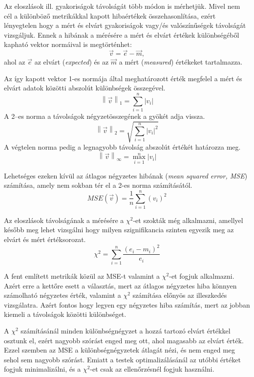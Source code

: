 

Az eloszlások ill. gyakoriságok távolságát több módon is mérhetjük.
Mivel nem cél a különböző metrikákkal kapott hibaértékek összehasonlítása, ezért lényegtelen hogy a mért és elvárt gyakoriságok vagy/és valószínűségek távolságát vizsgáljuk.
Ennek a hibának a mérésére a mért és elvárt értékek különbségéből kapható vektor normáival is megtörténhet:
\[
\vec{v} = \vec{e} - \vec{m},
\]
ahol az $\vec{e}$ az elvárt (\textit{expected}) és az $\vec{m}$ a mért (\textit{measured}) értékeket tartalmazza.

Az így kapott vektor 1-es normája által meghatározott érték megfelel a mért és elvárt adatok közötti abszolút különbségek összegével.
\[
\left\lVert\vec{v}\right\rVert_1 = \sum\limits_{i=1}^{n} |v_i|
\]
A 2--es norma a távolságok négyzetösszegének a gyökét adja vissza.
\[
\left\lVert\vec{v}\right\rVert_2 = \sqrt{\sum\limits_{i=1}^{n} |v_i|^2}
\]
A végtelen norma pedig a legnagyobb távolság abszolút értékét határozza meg.
\[
\left\lVert\vec{v}\right\rVert_\infty = \max\limits_{i=1}^{n} |v_i|
\]

Lehetséges ezeken kívül az átlagos négyzetes hibának (\textit{mean squared error, MSE}) számítása, amely nem sokban tér el a 2-es norma számításától.
\[
MSE(\vec{v}) = \frac{1}{n} \sum_{i=1}^{n}(v_i)^2
\]

Az eloszlások távolságának a mérésére a $\chi^2$-et szokták még alkalmazni, amellyel később meg lehet vizsgálni hogy milyen szignifikancia szinten egyezik meg az elvárt és mért értéksorozat.
\[
\chi^2=\sum_{i=1}^{n} \frac{(e_i - m_i)^2}{e_i}
\]

A fent említett metrikák közül az MSE-t valamint a $\chi^2$-et fogjuk alkalmazni.
Azért erre a kettőre esett a választás, mert az átlagos négyzetes hiba könnyen számolható négyzetes érték, valamint a $\chi^2$ számítása előnyös az illeszkedés vizsgálatra. 
Azért fontos hogy legyen egy négyzetes hiba számítás, mert az jobban kiemeli a távolságok közötti különbséget.

A $\chi^2$ számításánál minden különbségnégyzet a hozzá tartozó elvárt értékkel osztunk el, ezért nagyobb szórást enged meg ott, ahol magasabb az elvárt érték.
Ezzel szemben az MSE a különbségnégyzetek átlagát nézi, és nem enged meg sehol sem nagyobb szórást.
Emiatt a testek optimalizálásánál az utóbbi értéket fogjuk minimalizálni, és a $\chi^2$-et csak az ellenőrzésnél fogjuk használni.

